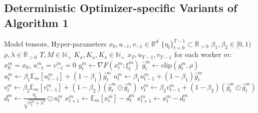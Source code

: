 \subsection{Deterministic Optimizer-specific Variants of Algorithm 1}
\label{sec:algorithm_variants}

\begin{algorithm}[h]
\caption{DES-LOC-Adam}
\label{alg:desloc_adam}
\begin{algorithmic}[1]
\REQUIRE Model tensors, Hyper-parameters
\STATE $x_0, u_{-1}, v_{-1} \in \mathbb{R}^d$ 
\STATE $\{\eta_t\}_{t=0}^{T-1} \subset \mathbb{R}_{>0}$ 
\STATE $\beta_1, \beta_2 \in [0,1)$ 
\STATE $\rho, \lambda \in \mathbb{R}_{>0}$ 
\STATE $T, M \in \mathbb{N}_+$ 
\STATE $K_x, K_u, K_v \in \mathbb{N}_+$ 
\ENSURE $x_T, u_{T-1}, v_{T-1}$
\STATE for each worker $m$: $x^m_0 = x_0$, $u^m_{-1} = v^m_{-1} = 0$ 
 
        \STATE $g^m_t \gets \nabla F(x^m_t; \xi^m_t)$ 
        \STATE $\hat{g}^m_t \gets \text{clip}(g^m_t, \rho)$ 
         
            \STATE $u^m_t \gets \beta_1 \mathbb{E}_m[u^m_{t-1}] + (1 - \beta_1)\hat{g}^m_t$
        \ELSE
            \STATE $u^m_t \gets \beta_1 u^m_{t-1} + (1 - \beta_1)\hat{g}^m_t$
        \ENDIF
         
            \STATE $v^m_t \gets \beta_2 \mathbb{E}_m[v^m_{t-1}] + (1 - \beta_2)(\hat{g}^m_t \odot \hat{g}^m_t)$
        \ELSE
            \STATE $v^m_t \gets \beta_2 v^m_{t-1} + (1 - \beta_2)(\hat{g}^m_t \odot \hat{g}^m_t)$
        \ENDIF
        \STATE $d^m_t \gets \frac{\eta_t}{\sqrt{v^m_t + \lambda^2}} \odot u^m_t$ 
         
            \STATE $x^m_{t+1} \gets \mathbb{E}_m[x^m_t] - d^m_t$
        \ELSE
            \STATE $x^m_{t+1} \gets x^m_t - d^m_t$
        \ENDIF
    \ENDFOR
\ENDFOR
\end{algorithmic}
\end{algorithm}

